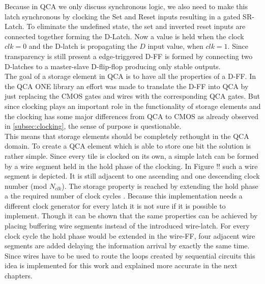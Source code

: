Because in QCA we only discuss synchronous logic, we also need to make this latch synchronous by clocking the Set and Reset inputs resulting in a gated SR-Latch. To eliminate the undefined state, the set and inverted reset inputs are connected together forming the D-Latch. Now a value is held when the clock $clk=0$ and the D-latch is propagating the $D$ input value, when $clk=1$. Since transparency is still present a edge-triggered D-FF is formed by connecting two D-latches to a master-slave D-flip-flop producing only stable outputs.\\
The goal of a storage element in QCA is to have all the properties of a D-FF. In the QCA ONE library an effort was made to translate the D-FF into QCA by just replacing the CMOS gates and wires with the corresponding QCA gates. But since clocking plays an important role in the functionality of storage elements and the clocking has some major differences from QCA to CMOS as already observed in \ref{subsec:clocking}, the sense of purpose is questionable.\\
This means that storage elements should be completely rethought in the QCA domain. To create a QCA element which is able to store one bit the solution is rather simple. Since every tile is clocked on its own, a simple latch can be formed by a wire segment held in the hold phase of the clocking. In Figure !! such a wire segment is depicted. It is still adjacent to one ascending and one descending clock number (mod $N_{clk}$). The storage property is reached by extending the hold phase a the required number of clock cycles \cite{Walter}. 
Because this implementation needs a different clock generator for every latch it is not sure if it is possible to implement. Though it can be shown that the same properties can be achieved by placing buffering wire segments instead of the introduced wire-latch. For every clock cycle the hold phase would be extended in the wire-FF, four adjacent wire segments are added delaying the information arrival by exactly the same time. Since wires have to be used to route the loops created by sequential circuits this idea is implemented for this work and explained more accurate in the next chapters.
\\
